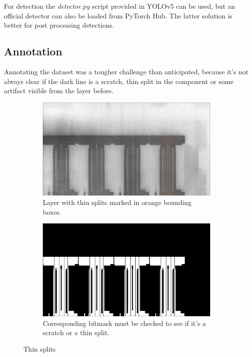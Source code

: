 For detection the \textit{detector.py} script provided in YOLOv5 can be used, but an official detector can also be loaded from PyTorch Hub. The latter solution is better for post processing detections.

\subsection{Annotation}
Annotating the dataset was a tougher challenge than anticipated, because it's not always clear if the dark line is a scratch, thin split in the component or some artifact visible from the layer before. \\

\begin{figure}[ht]
  \centering

  \begin{subfigure}{\textwidth}
    \includegraphics[width=\textwidth]{images/layer_01486_marked}
    \caption{Layer with thin splits marked in orange bounding boxes.}

  \end{subfigure}

  \begin{subfigure}{\textwidth}
    \includegraphics[width=\textwidth]{images/bitmask_01486}
    \caption{Corresponding bitmask must be checked to see if it's a scratch or a thin split.}
  \end{subfigure}

  \caption{Thin splits}
  \label{fig:thin_splits}

\end{figure}

